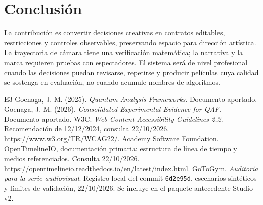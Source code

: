 \section{Conclusión}
La contribución es convertir decisiones creativas en contratos editables, restricciones y controles observables, preservando espacio para dirección artística. La trayectoria de cámara tiene una verificación matemática; la narrativa y la marca requieren pruebas con espectadores. El sistema será de nivel profesional cuando las decisiones puedan revisarse, repetirse y producir películas cuya calidad se sostenga en evaluación, no cuando acumule nombres de algoritmos.

\begin{thebibliography}{E3}
 Goenaga, J. M. (2025). \emph{Quantum Analysis Frameworks}. Documento aportado.
 Goenaga, J. M. (2026). \emph{Consolidated Experimental Evidence for QAF}. Documento aportado.
 W3C. \emph{Web Content Accessibility Guidelines 2.2}. Recomendación de 12/12/2024, consulta 22/10/2026. \url{https://www.w3.org/TR/WCAG22/}.
 Academy Software Foundation. OpenTimelineIO, documentación primaria: estructura de línea de tiempo y medios referenciados. Consulta 22/10/2026. \url{https://opentimelineio.readthedocs.io/en/latest/index.html}.
 GoToGym. \emph{Auditoría para la serie audiovisual}. Registro local del commit \texttt{6d2e95d}, escenarios sintéticos y límites de validación, 22/10/2026. Se incluye en el paquete antecedente Studio v2.
\end{thebibliography}

